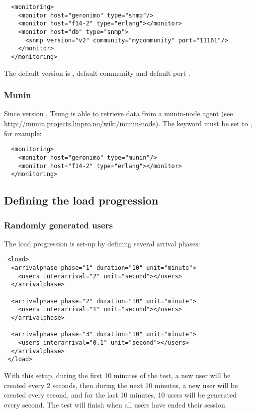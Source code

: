 \documentclass{TSUNG-en}
\begin{document}
\begin{Verbatim}
  <monitoring>
    <monitor host="geronimo" type="snmp"/>
    <monitor host="f14-2" type="erlang"></monitor>
    <monitor host="db" type="snmp">
      <snmp version="v2" community="mycommunity" port="11161"/>
    </monitor>
  </monitoring>
\end{Verbatim}

The default version is , default community
 and default port .

\subsubsection{Munin}

Since version , Tsung is able to retrieve data from a munin-node agent
(see \url{http://munin.projects.linpro.no/wiki/munin-node}). The 
keyword must be set to , for example:

\begin{Verbatim}
  <monitoring>
    <monitor host="geronimo" type="munin"/>
    <monitor host="f14-2" type="erlang"></monitor>
  </monitoring>
\end{Verbatim}

\subsection{Defining the load progression}

\subsubsection{Randomly generated users}

The load progression is set-up by defining several arrival phases:

\begin{Verbatim}
 <load>
  <arrivalphase phase="1" duration="10" unit="minute">
    <users interarrival="2" unit="second"></users>
  </arrivalphase>

  <arrivalphase phase="2" duration="10" unit="minute">
    <users interarrival="1" unit="second"></users>
  </arrivalphase>

  <arrivalphase phase="3" duration="10" unit="minute">
    <users interarrival="0.1" unit="second"></users>
  </arrivalphase>
 </load>
\end{Verbatim}

With this setup, during the first 10 minutes of the test, a new user
will be created every 2 seconds, then during the next 10 minutes, a
new user will be created every second, and for the last 10 minutes,
10 users will be generated every second. The test will finish when
all users have ended their session.
\end{document}
